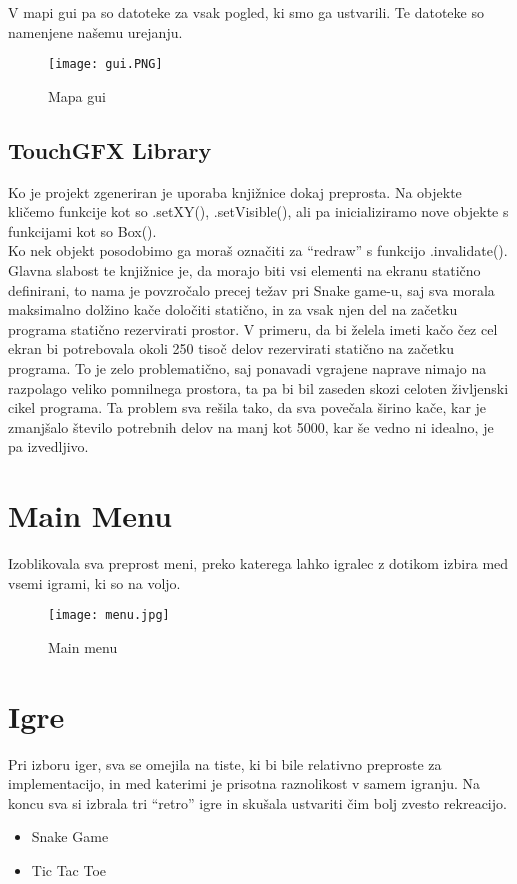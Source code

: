 \documentclass{article}
\begin{document}
\noindent
V mapi gui pa so datoteke za vsak pogled, ki smo ga ustvarili. Te
datoteke so namenjene na\v{s}emu urejanju.
\begin{figure}[H] %
  \centering
  \texttt{[image: gui.PNG]}
  \caption{Mapa gui}
\end{figure}

\subsection{TouchGFX Library}
\noindent
Ko je projekt zgeneriran je uporaba knji\v{z}nice dokaj
preprosta. Na objekte kli\v{c}emo funkcije kot so .setXY(),
.setVisible(), ali pa inicializiramo nove objekte s funkcijami kot
so Box(). \\
Ko nek objekt posodobimo ga mora\v{s} ozna\v{c}iti za ``redraw'' s
funkcijo .invalidate(). \\
Glavna slabost te knji\v{z}nice je, da morajo biti vsi elementi na
ekranu stati\v{c}no definirani, to nama je povzro\v{c}alo precej te\v{z}av
pri Snake game-u, saj sva morala maksimalno dol\v{z}ino ka\v{c}e
dolo\v{c}iti stati\v{c}no, in za vsak njen del na za\v{c}etku programa
stati\v{c}no rezervirati prostor. V primeru, da bi
\v{z}elela imeti ka\v{c}o \v{c}ez cel ekran bi potrebovala okoli 250
tiso\v{c} delov rezervirati stati\v{c}no na za\v{c}etku programa. To je
zelo problemati\v{c}no, saj ponavadi vgrajene naprave nimajo na razpolago
veliko pomnilnega prostora, ta pa bi bil zaseden skozi celoten \v{z}ivljenski
cikel programa. Ta problem sva re\v{s}ila tako, da sva pove\v{c}ala \v{s}irino
ka\v{c}e, kar je zmanj\v{s}alo \v{s}tevilo potrebnih delov na
manj kot 5000, kar \v{s}e vedno ni idealno, je pa izvedljivo.


\section{Main Menu}
\noindent
Izoblikovala sva preprost meni, preko katerega lahko igralec z dotikom
izbira med vsemi igrami, ki so na voljo. \\
\begin{figure}[H] %
  \centering
  \texttt{[image: menu.jpg]}
  \caption{Main menu}
\end{figure}

\section{Igre}
\noindent
Pri izboru iger, sva se omejila na tiste, ki bi bile relativno preproste
za implementacijo, in med katerimi je prisotna raznolikost v samem
igranju. Na koncu sva si izbrala tri ``retro'' igre in sku\v{s}ala
ustvariti \v{c}im bolj zvesto rekreacijo.
\begin{itemize}
  \item Snake Game
  \item Tic Tac Toe
\end{itemize}
\end{document}
